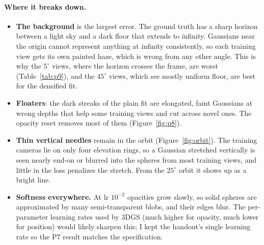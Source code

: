 \documentclass[11pt]{article}
\begin{document}
\paragraph{Where it breaks down.}
\begin{itemize}
\item \textbf{The background} is the largest error. The ground truth has a sharp horizon between a light sky and a dark floor that extends to infinity. Gaussians near the origin cannot represent anything at infinity consistently, so each training view gets its own painted haze, which is wrong from any other angle. This is why the $5^\circ$ views, where the horizon crosses the frame, are worst (Table~\ref{tab:p9}), and the $45^\circ$ views, which see mostly uniform floor, are best for the densified fit.
\item \textbf{Floaters}: the dark streaks of the plain fit are elongated, faint Gaussians at wrong depths that help some training views and cut across novel ones. The opacity reset removes most of them (Figure~\ref{fig:p8}).
\item \textbf{Thin vertical needles} remain in the orbit (Figure~\ref{fig:orbit}). The training cameras lie on only four elevation rings, so a Gaussian stretched vertically is seen nearly end-on or blurred into the spheres from most training views, and little in the loss penalizes the stretch. From the $25^\circ$ orbit it shows up as a bright line.
\item \textbf{Softness everywhere.} At lr $10^{-2}$ opacities grow slowly, so solid spheres are approximated by many semi-transparent blobs, and their edges blur. The per-parameter learning rates used by 3DGS (much higher for opacity, much lower for position) would likely sharpen this; I kept the handout's single learning rate so the P7 result matches the specification.
\end{itemize}
\end{document}
